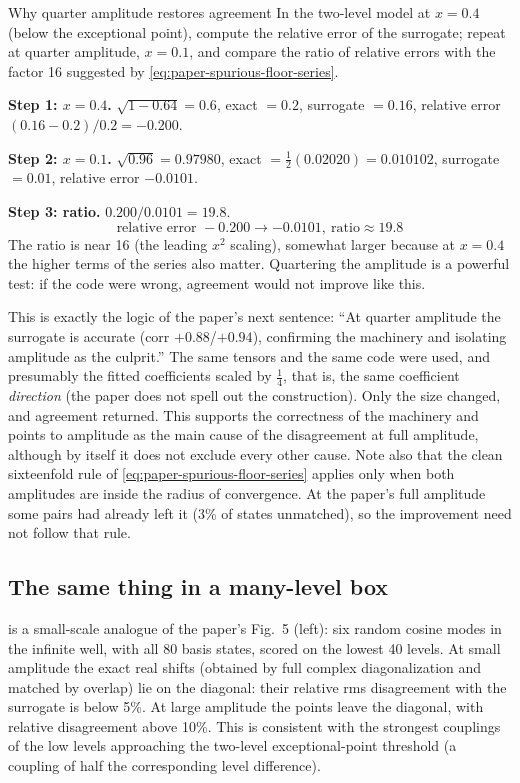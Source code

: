 \begin{sample}{Why quarter amplitude restores agreement}
In the two-level model at $x=0.4$ (below the exceptional point), compute the relative error of the surrogate; repeat at quarter amplitude, $x=0.1$, and compare the ratio of relative errors with the factor 16 suggested by \cref{eq:paper-spurious-floor-series}.

\textbf{Step 1: $x=0.4$.} $\sqrt{1-0.64}=0.6$, exact $=0.2$, surrogate $=0.16$, relative error $(0.16-0.2)/0.2=-0.200$.

\textbf{Step 2: $x=0.1$.} $\sqrt{0.96}=0.97980$, exact $=\tfrac12(0.02020)=0.010102$, surrogate $=0.01$, relative error $-0.0101$.

\textbf{Step 3: ratio.} $0.200/0.0101=19.8$.
\[
\boxed{\text{relative error }-0.200\to-0.0101,\ \text{ratio}\approx19.8}
\]
The ratio is near 16 (the leading $x^2$ scaling), somewhat larger because at $x=0.4$ the higher terms of the series also matter. Quartering the amplitude is a powerful test: if the code were wrong, agreement would not improve like this.
\end{sample}

This is exactly the logic of the paper's next sentence: ``At quarter amplitude the surrogate is accurate (corr $+0.88$/$+0.94$), confirming the machinery and isolating amplitude as the culprit.'' The same tensors and the same code were used, and presumably the fitted coefficients scaled by $\tfrac14$, that is, the same coefficient \emph{direction} (the paper does not spell out the construction). Only the size changed, and agreement returned. This supports the correctness of the machinery and points to amplitude as the main cause of the disagreement at full amplitude, although by itself it does not exclude every other cause. Note also that the clean sixteenfold rule of \cref{eq:paper-spurious-floor-series} applies only when both amplitudes are inside the radius of convergence. At the paper's full amplitude some pairs had already left it (3\% of states unmatched), so the improvement need not follow that rule.

\subsection{The same thing in a many-level box}

 is a small-scale analogue of the paper's Fig.~5 (left): six random cosine modes in the infinite well, with all 80 basis states, scored on the lowest 40 levels. At small amplitude the exact real shifts (obtained by full complex diagonalization and matched by overlap) lie on the diagonal: their relative rms disagreement with the surrogate is below 5\%. At large amplitude the points leave the diagonal, with relative disagreement above 10\%. This is consistent with the strongest couplings of the low levels approaching the two-level exceptional-point threshold (a coupling of half the corresponding level difference).

